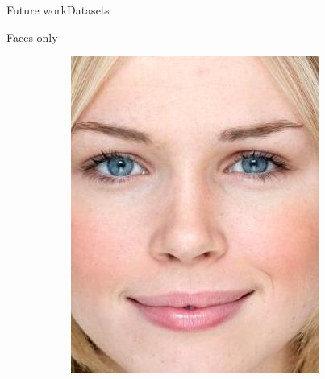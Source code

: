 \begin{frame}{Future work}{Datasets}
\begin{block}{Faces only}
\begin{figure}
\begin{subfigure}[b]{0.15\textwidth}
                \includegraphics[width=\textwidth]{sections/malte_slides/crop6}
            \end{subfigure}
            \begin{subfigure}[b]{0.15\textwidth}
                \centering

\end{subfigure}
\end{figure}
\end{block}
\end{frame}
